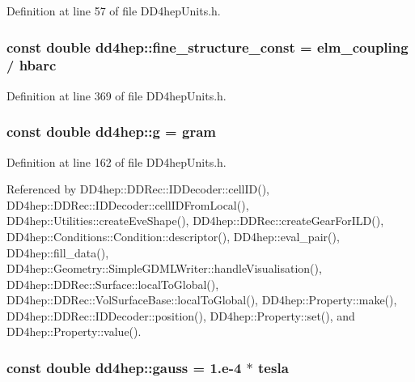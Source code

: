 Definition at line 57 of file DD4hepUnits.h.\hypertarget{namespacedd4hep_aa979b30c6c7f9ba61132327d4584bfde}{
\subsubsection[{fine\_\-structure\_\-const}]{\setlength{\rightskip}{0pt plus 5cm}const double {\bf dd4hep::fine\_\-structure\_\-const} = {\bf elm\_\-coupling} / {\bf hbarc}}}
\label{namespacedd4hep_aa979b30c6c7f9ba61132327d4584bfde}


Definition at line 369 of file DD4hepUnits.h.\hypertarget{namespacedd4hep_a70d02ec06109b52625ae28861ff25d56}{
\subsubsection[{g}]{\setlength{\rightskip}{0pt plus 5cm}const double {\bf dd4hep::g} = {\bf gram}}}
\label{namespacedd4hep_a70d02ec06109b52625ae28861ff25d56}


Definition at line 162 of file DD4hepUnits.h.

Referenced by DD4hep::DDRec::IDDecoder::cellID(), DD4hep::DDRec::IDDecoder::cellIDFromLocal(), DD4hep::Utilities::createEveShape(), DD4hep::DDRec::createGearForILD(), DD4hep::Conditions::Condition::descriptor(), DD4hep::eval\_\-pair(), DD4hep::fill\_\-data(), DD4hep::Geometry::SimpleGDMLWriter::handleVisualisation(), DD4hep::DDRec::Surface::localToGlobal(), DD4hep::DDRec::VolSurfaceBase::localToGlobal(), DD4hep::Property::make(), DD4hep::DDRec::IDDecoder::position(), DD4hep::Property::set(), and DD4hep::Property::value().\hypertarget{namespacedd4hep_ae816701c091bbba2ffee47efd2e88cd8}{
\subsubsection[{gauss}]{\setlength{\rightskip}{0pt plus 5cm}const double {\bf dd4hep::gauss} = 1.e-\/4 $\ast$ {\bf tesla}}}
\label{namespacedd4hep_ae816701c091bbba2ffee47efd2e88cd8}


